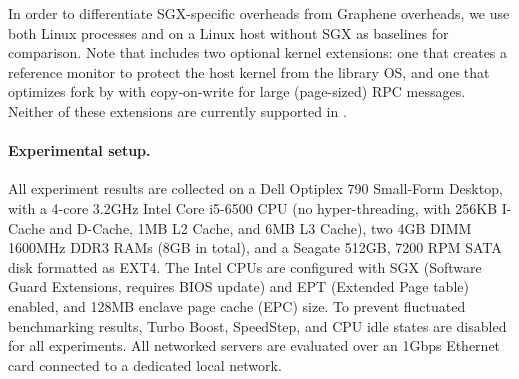 
In order to differentiate SGX-specific overheads 
from Graphene overheads,
we use both
Linux processes and \graphene{} on a Linux host without SGX as baselines
for comparison.
Note that \graphene{} includes two optional kernel extensions:
one that creates a reference monitor to protect the host kernel from 
the library OS, and one that optimizes fork by 
with copy-on-write for large (page-sized) RPC messages.
Neither of these extensions are currently supported in \graphenesgx{}.



\paragraph{Experimental setup.}

All experiment results are collected on a Dell Optiplex 790 Small-Form Desktop,
with a 4-core 3.2GHz Intel Core i5-6500 CPU (no hyper-threading, with 256KB I-Cache and D-Cache, 1MB L2 Cache, and 6MB L3 Cache),
two 4GB DIMM 1600MHz DDR3 RAMs (8GB in total), and a Seagate 512GB, 7200 RPM SATA disk formatted as EXT4.
The Intel CPUs are configured with SGX (Software Guard Extensions, requires BIOS update) and EPT (Extended Page table) enabled, and 128MB enclave page cache (EPC) size.
To prevent fluctuated benchmarking results,
Turbo Boost, SpeedStep, and CPU idle states are disabled for
all experiments.
All networked servers are evaluated over an 1Gbps Ethernet card connected to a dedicated local network.

